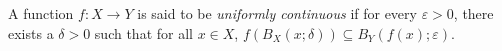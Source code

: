 \begin{definition} \label{def:cont:uniform}
    A function $f\colon X \to Y$ is said to be \emph{uniformly continuous}
    if for every $\varepsilon > 0$, there exists a $\delta > 0$ such that
    for all $x \in X$, $f(B_X(x; \delta)) \subseteq B_Y(f(x); \varepsilon)$.
\end{definition}
